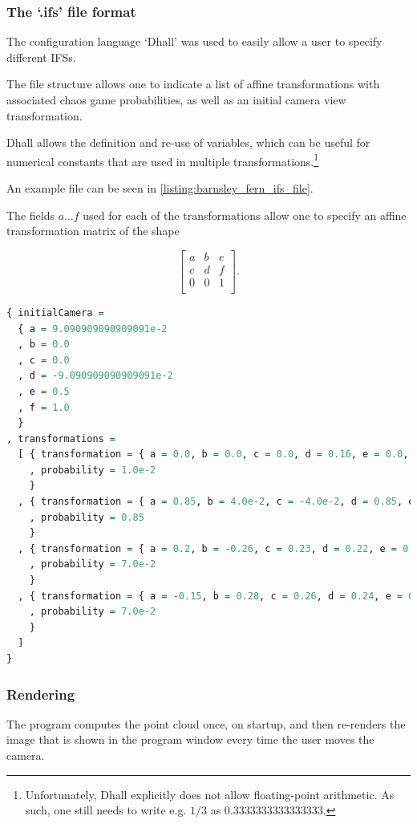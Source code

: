 \documentclass[11pt]{article}
\begin{document}
\subsubsection{The `.ifs' file format}
\label{sec:org9cc2959}

The configuration language `Dhall' \cite{gonzalez2019} was used to 
easily allow a user to specify different IFSs.

The file structure allows one to indicate a list of affine transformations with associated chaos game probabilities,
as well as an initial camera view transformation.

Dhall allows the definition and re-use of variables, which can be useful
for numerical constants that are used in multiple transformations.\footnote{Unfortunately, Dhall explicitly does not allow floating-point arithmetic.
As such, one still needs to write e.g. \(1/3\) as \(0.3333333333333333\).}

An example file can be seen in \autoref{listing:barnsley_fern_ifs_file}.

The fields \(a \ldots f\) used for each of the transformations allow one to specify an affine transformation matrix of the shape

$$\begin{bmatrix} a & b & e \\ c & d & f \\ 0 & 0 & 1 \\ \end{bmatrix}.$$


\begin{lstlisting}[float, language=Haskell, frame=single, breaklines=true, basicstyle=\scriptsize\tt, captionpos=b, caption={barnsley\_fern.ifs, representing \autoref{ifs:barnsley_fern}}, label={listing:barnsley_fern_ifs_file}]
{ initialCamera =
  { a = 9.090909090909091e-2
  , b = 0.0
  , c = 0.0
  , d = -9.090909090909091e-2
  , e = 0.5
  , f = 1.0
  }
, transformations =
  [ { transformation = { a = 0.0, b = 0.0, c = 0.0, d = 0.16, e = 0.0, f = 0.0 }
    , probability = 1.0e-2
    }
  , { transformation = { a = 0.85, b = 4.0e-2, c = -4.0e-2, d = 0.85, e = 0.0, f = 1.6 }
    , probability = 0.85
    }
  , { transformation = { a = 0.2, b = -0.26, c = 0.23, d = 0.22, e = 0.0, f = 1.6 }
    , probability = 7.0e-2
    }
  , { transformation = { a = -0.15, b = 0.28, c = 0.26, d = 0.24, e = 0.0, f = 0.44 }
    , probability = 7.0e-2
    }
  ]
}

\end{lstlisting}

\subsubsection{Rendering}
\label{sec:org6f88d76}
The program computes the point cloud once, on startup, and then re-renders the image that is shown in the program window
every time the user moves the camera.
\end{document}
